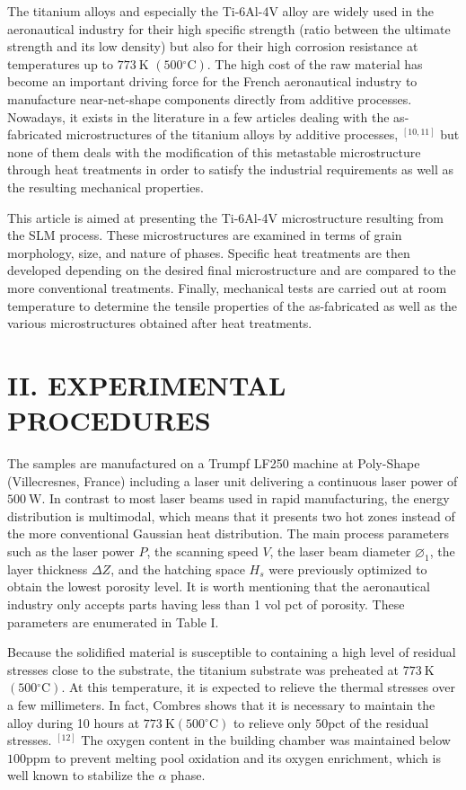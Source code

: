 \documentclass[10pt]{article}
\begin{document}
The titanium alloys and especially the Ti-6Al-4V alloy are widely used in the aeronautical industry for their high specific strength (ratio between the ultimate strength and its low density) but also for their high corrosion resistance at temperatures up to $773 \mathrm{~K}$ $\left(500{ }^{\circ} \mathrm{C}\right)$. The high cost of the raw material has become an important driving force for the French aeronautical industry to manufacture near-net-shape components directly from additive processes. Nowadays, it exists in the literature in a few articles dealing with the as-fabricated microstructures of the titanium alloys by additive processes, ${ }^{[10,11]}$ but none of them deals with the modification of this metastable microstructure through heat treatments in order to satisfy the industrial requirements as well as the resulting mechanical properties.

This article is aimed at presenting the Ti-6Al-4V microstructure resulting from the SLM process. These microstructures are examined in terms of grain\\
morphology, size, and nature of phases. Specific heat treatments are then developed depending on the desired final microstructure and are compared to the more conventional treatments. Finally, mechanical tests are carried out at room temperature to determine the tensile properties of the as-fabricated as well as the various microstructures obtained after heat treatments.

\section*{II. EXPERIMENTAL PROCEDURES}
The samples are manufactured on a Trumpf LF250 machine at Poly-Shape (Villecresnes, France) including a laser unit delivering a continuous laser power of $500 \mathrm{~W}$. In contrast to most laser beams used in rapid manufacturing, the energy distribution is multimodal, which means that it presents two hot zones instead of the more conventional Gaussian heat distribution. The main process parameters such as the laser power $P$, the scanning speed $V$, the laser beam diameter $\varnothing_{1}$, the layer thickness $\Delta Z$, and the hatching space $H_{s}$ were previously optimized to obtain the lowest porosity level. It is worth mentioning that the aeronautical industry only accepts parts having less than 1 vol pct of porosity. These parameters are enumerated in Table I.

Because the solidified material is susceptible to containing a high level of residual stresses close to the substrate, the titanium substrate was preheated at $773 \mathrm{~K}$ $\left(500{ }^{\circ} \mathrm{C}\right)$. At this temperature, it is expected to relieve the thermal stresses over a few millimeters. In fact, Combres shows that it is necessary to maintain the alloy during 10 hours at $773 \mathrm{~K}\left(500{ }^{\circ} \mathrm{C}\right)$ to relieve only $50 \mathrm{pct}$ of the residual stresses. ${ }^{[12]}$ The oxygen content in the building chamber was maintained below $100 \mathrm{ppm}$ to prevent melting pool oxidation and its oxygen enrichment, which is well known to stabilize the $\alpha$ phase.
\end{document}
